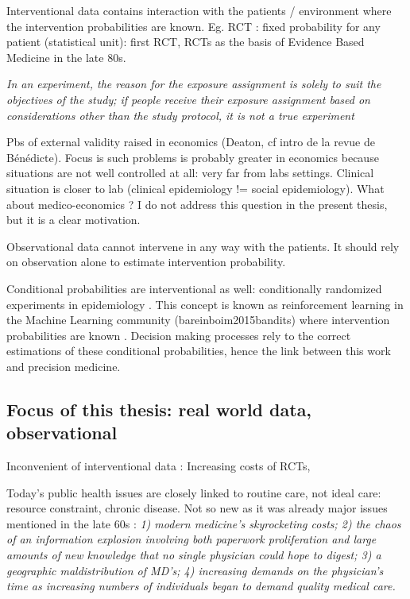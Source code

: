 \documentclass[french,12pt,twoside,a4paper]{book}
\begin{document}
\begin{background_box_left}
  Interventional data contains interaction with the patients / environment where
  the intervention probabilities are known. Eg. RCT : fixed probability for any
  patient (statistical unit): first RCT, RCTs as the basis of Evidence Based
  Medicine in the late 80s.

  \textit{In an experiment, the reason for the exposure assignment is solely to
    suit the objectives of the study; if people receive their exposure assignment
    based on considerations other than the study protocol, it is not a true
    experiment} \citep{rothman2012epidemiology}

  Pbs of external validity raised in economics (Deaton, cf intro de la revue de
  Bénédicte). Focus is such problems is probably greater in economics because
  situations are not well controlled at all: very far from labs settings. Clinical
  situation is closer to lab (clinical epidemiology != social epidemiology). What
  about medico-economics ? I do not address this question in the present thesis,
  but it is a clear motivation.

  Observational data cannot intervene in any way with the patients. It should rely
  on observation alone to estimate intervention probability.

  Conditional probabilities are interventional as well: conditionally randomized
  experiments in epidemiology \citep{hernan2020causal}. This concept is known as
  reinforcement learning in the Machine Learning community (bareinboim2015bandits)
  where intervention probabilities are known \citep{bareinboim2015bandits}.
  Decision making processes rely to the correct estimations of these
  conditional probabilities, hence the link between this work and precision medicine.

\end{background_box_left}

\subsection{Focus of this thesis: real world data, observational}\label{subsec:intro:focus_data}

Inconvenient of interventional data : Increasing costs of RCTs,

Today's public health issues are closely linked to routine care, not ideal care:
resource constraint, chronic disease. Not so new as it was already major issues
mentioned in the late 60s \citep{rutstein1967coming}: \textit{1) modern
  medicine's skyrocketing costs; 2) the chaos of an information explosion
  involving both paperwork proliferation and large amounts of new knowledge that
  no single physician could hope to digest; 3) a geographic maldistribution of
  MD's; 4) increasing demands on the physician's time as increasing numbers of
  individuals began to demand quality medical care.}
\end{document}
